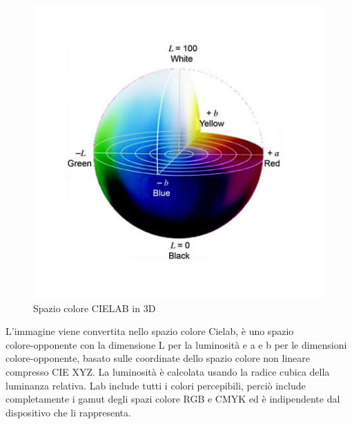 \documentclass[a4paper,12pt]{report}
\begin{document}
\begin{figure}
\begin{minipage}{0.35\textwidth}
          \includegraphics[width=\textwidth]{assets/images/methods/porting/cielab/cielab1.jpg}   
          \caption{Spazio colore CIELAB in 3D}
        \end{minipage}
      \end{figure}

      L'immagine viene convertita nello spazio colore Cielab, è uno spazio \\
      colore-opponente con la dimensione L per la luminosità e a e b per le dimensioni colore-opponente,
      basato sulle coordinate dello spazio colore non lineare compresso CIE XYZ.
      La luminosità è calcolata usando la radice cubica della luminanza relativa. 
      Lab include tutti i colori percepibili, perciò include completamente i gamut degli 
      spazi colore RGB e CMYK ed è indipendente dal dispositivo che li rappresenta.
      
\end{document}
